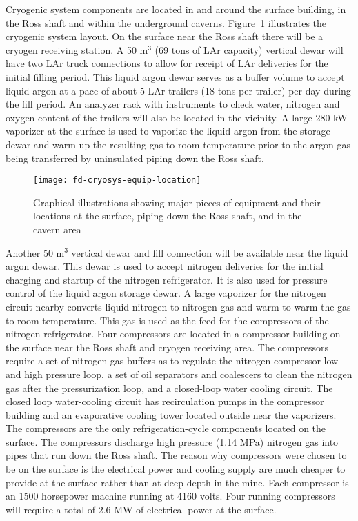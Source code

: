 Cryogenic system components are located in and around the surface 
building, in the Ross shaft and within the underground caverns. 
Figure~\ref{fig:eqp-at-surface} illustrates 
the cryogenic system layout. On the surface near the Ross 
shaft there will be a cryogen 
receiving station. A 50 m$^3$ (69 tons of LAr capacity) 
vertical dewar will have two LAr truck connections 
to allow for receipt of LAr deliveries for the initial
filling period. This liquid argon dewar serves as a buffer volume 
to accept liquid argon at a pace of about 5 LAr trailers 
(18 tons per trailer) per day during the fill period. An analyzer
rack with instruments to check water, nitrogen and oxygen content 
of the trailers will also be located in the vicinity. A large 
280 kW vaporizer at the surface is used to vaporize the liquid
argon from the storage dewar and warm up the resulting gas to 
room temperature prior to the argon gas being 
transferred by uninsulated piping down the Ross shaft.

\begin{figure}[htbp]
\centering
\texttt{[image: fd-cryosys-equip-location]} 
\caption[Major pieces of equipment and their locations]{Graphical illustrations showing major pieces of equipment and their locations at the
surface, piping down the Ross shaft, and in the cavern area}
\label{fig:eqp-at-surface}
\end{figure}

Another 50 m$^3$ vertical dewar and fill connection will be 
available near the liquid argon dewar. This dewar is used 
to accept nitrogen deliveries for the initial charging and startup of
the nitrogen refrigerator. It is also used for pressure control of 
the liquid argon storage dewar. A large vaporizer for the nitrogen 
circuit nearby converts liquid nitrogen to nitrogen gas and warm to
warm the gas to room temperature. This gas is used as the feed for
the compressors of the nitrogen refrigerator. Four compressors are 
located in a compressor building on the surface near the Ross shaft 
and cryogen receiving area. The compressors require a set of nitrogen 
gas buffers as to regulate the nitrogen compressor low and high 
pressure loop, a set of oil separators and coalescers to clean the 
nitrogen gas after the pressurization loop, and a closed-loop water 
cooling circuit. The closed loop water-cooling circuit has 
recirculation pumps in the compressor 
building and an evaporative cooling tower located outside 
near the vaporizers. The compressors are the only refrigeration-cycle 
components located on the surface. The compressors discharge high 
pressure (1.14 MPa) nitrogen gas into
pipes that run down the Ross shaft. 
The reason why compressors were chosen to be on the 
surface is the electrical power and cooling supply 
are much cheaper to provide at the surface rather 
than at deep depth in the mine. Each compressor is an 
1500 horsepower machine running at 4160 volts. 
Four running compressors will require a total of
2.6 MW of electrical power at the surface.


